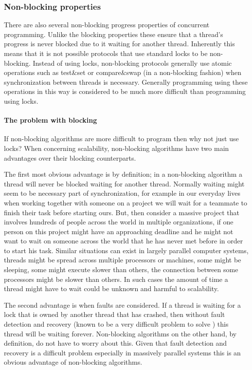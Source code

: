 \subsubsection{Non-blocking properties}
There are also several non-blocking progress properties of concurrent programming.
Unlike the blocking properties these ensure that a thread's progress is never blocked
due to it waiting for another thread.
Inherently this means that it is not possible protocols that use standard locks
to be non-blocking.
Instead of using locks, non-blocking protocols generally use atomic operations
such as test\&set or compare\&swap (in a non-blocking fashion) when synchronization between threads is necessary.
Generally programming using these operations in this way is considered to be much more difficult than
programming using locks.

\paragraph{The problem with blocking}
If non-blocking algorithms are more difficult to program then why not just use locks?
When concerning scalability, non-blocking algorithms have two main advantages over their blocking counterparts.

The first most obvious advantage is by definition; in a non-blocking algorithm a thread will never be blocked
waiting for another thread.
Normally waiting might seem to be necessary part of synchronization, for example in our everyday lives when working together
with someone on a project we will wait for a teammate to finish their task before starting ours.
But, then consider a massive project that involves hundreds of people across the world in multiple organizations,
if one person on this project might have an approaching deadline and he might not want to wait on someone across the
world that he has never met before in order to start his task.
Similar situations can exist in largely parallel computer systems, threads might be spread across multiple
processors or machines, some might be sleeping, some might execute slower than others, the connection between
some processors might be slower than others.
In such cases the amount of time a thread might have to wait could be unknown and harmful to scalability.

The second advantage is when faults are considered.
If a thread is waiting for a lock that is owned by another thread that has crashed,
then without fault detection and recovery (known to be a very difficult problem to solve \cite{ACT00})
this thread will be waiting forever.
Non-blocking algorithms on the other hand, by definition, do not have to worry about this.
Given that fault detection and recovery is a difficult problem especially in massively parallel
systems this is an obvious advantage of non-blocking algorithms.

